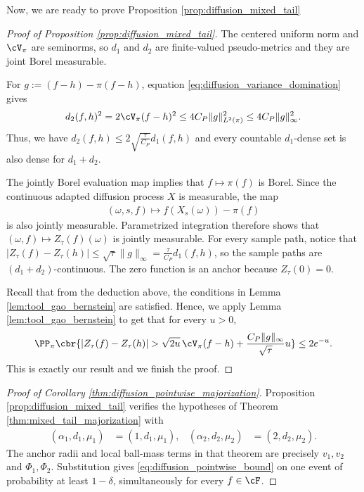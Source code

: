 \documentclass[11pt]{article}
\begin{document}
Now, we are ready to prove Proposition \ref{prop:diffusion_mixed_tail}
\begin{proof}[Proof of Proposition \ref{prop:diffusion_mixed_tail}]
The centered uniform norm and $\cV_\pi$ are seminorms, so $d_1$ and
$d_2$ are finite-valued pseudo-metrics and they are joint Borel measurable.

For $g:=(f-h)-\pi(f-h)$, equation
\eqref{eq:diffusion_variance_domination} gives
\begin{align*}
d_2(f,h)^2=
2\cV_\pi(f-h)^2\le
4C_P\|g\|_{L^2(\pi)}^2
\le
4C_P\|g\|_\infty^2.
\end{align*}
Thus, we have $d_2(f,h)
\le
2\sqrt{\frac{\tau}{C_P}}d_1(f,h)$ and every countable $d_1$-dense set is also dense for $d_1+d_2$.

The jointly Borel evaluation map implies that $f\mapsto\pi(f)$ is
Borel. Since the continuous adapted diffusion process $X$ is measurable, the map
\begin{align*}
(\omega,s,f)
\longmapsto
f(X_s(\omega))-\pi(f)
\end{align*}
is also jointly measurable. Parametrized integration therefore shows that
$(\omega,f)\mapsto Z_\tau(f)(\omega)$ is jointly measurable. For every
sample path, notice that
$|Z_\tau(f)-Z_\tau(h)|\le
\sqrt\tau\|g\|_\infty
=
\frac{\tau}{C_P}d_1(f,h)$,
so the sample paths are $(d_1+d_2)$-continuous. The zero function is an
anchor because $Z_\tau(0)=0$.

Recall that from the deduction above, the conditions in Lemma \ref{lem:tool_gao_bernstein} are satisfied. Hence, we apply Lemma \ref{lem:tool_gao_bernstein} to get that for every $u>0$,
\begin{align*}
\PP_\pi\cbr{
|Z_\tau(f)-Z_\tau(h)|
>
\sqrt{2u}\,\cV_\pi(f-h)
+
\frac{C_P\|g\|_\infty}{\sqrt\tau}u
}
\le2e^{-u}.
\end{align*}
This is exactly our result and we finish the proof.
\end{proof}

\begin{proof}[Proof of Corollary
\ref{thm:diffusion_pointwise_majorization}]
Proposition \ref{prop:diffusion_mixed_tail} verifies the hypotheses of
Theorem \ref{thm:mixed_tail_majorization} with
\begin{align*}
(\alpha_1,d_1,\mu_1)
&=(1,d_1,\mu_1),
&
(\alpha_2,d_2,\mu_2)
&=(2,d_2,\mu_2).
\end{align*}
The anchor radii and local ball-mass terms in that theorem are precisely
$v_1,v_2$ and $\Phi_1,\Phi_2$. Substitution gives
\eqref{eq:diffusion_pointwise_bound} on one event of probability at least
$1-\delta$, simultaneously for every $f\in\cF$.
\end{proof}
\end{document}
